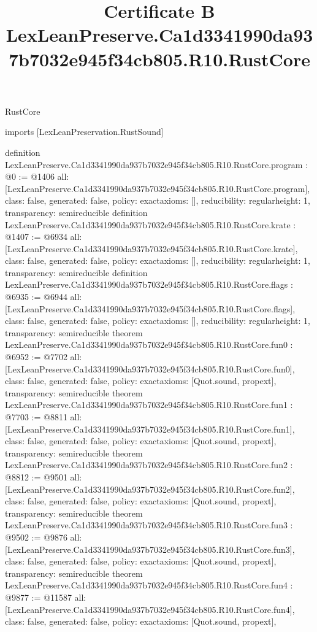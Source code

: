 \begin{lexlean}{RustCore}
\title{Certificate B LexLeanPreserve.Ca1d3341990da937b7032e945f34cb805.R10.RustCore}
\begin{coremodule}
imports [LexLeanPreservation.RustSound]

definition LexLeanPreserve.Ca1d3341990da937b7032e945f34cb805.R10.RustCore.program : @0 := @1406 {
  all: [LexLeanPreserve.Ca1d3341990da937b7032e945f34cb805.R10.RustCore.program],
  class: false,
  generated: false,
  policy: exact{axioms: []},
  reducibility: regular{height: 1},
  transparency: semireducible
}
definition LexLeanPreserve.Ca1d3341990da937b7032e945f34cb805.R10.RustCore.krate : @1407 := @6934 {
  all: [LexLeanPreserve.Ca1d3341990da937b7032e945f34cb805.R10.RustCore.krate],
  class: false,
  generated: false,
  policy: exact{axioms: []},
  reducibility: regular{height: 1},
  transparency: semireducible
}
definition LexLeanPreserve.Ca1d3341990da937b7032e945f34cb805.R10.RustCore.flags : @6935 := @6944 {
  all: [LexLeanPreserve.Ca1d3341990da937b7032e945f34cb805.R10.RustCore.flags],
  class: false,
  generated: false,
  policy: exact{axioms: []},
  reducibility: regular{height: 1},
  transparency: semireducible
}
theorem LexLeanPreserve.Ca1d3341990da937b7032e945f34cb805.R10.RustCore.fun0 : @6952 := @7702 {
  all: [LexLeanPreserve.Ca1d3341990da937b7032e945f34cb805.R10.RustCore.fun0],
  class: false,
  generated: false,
  policy: exact{axioms: [Quot.sound, propext]},
  transparency: semireducible
}
theorem LexLeanPreserve.Ca1d3341990da937b7032e945f34cb805.R10.RustCore.fun1 : @7703 := @8811 {
  all: [LexLeanPreserve.Ca1d3341990da937b7032e945f34cb805.R10.RustCore.fun1],
  class: false,
  generated: false,
  policy: exact{axioms: [Quot.sound, propext]},
  transparency: semireducible
}
theorem LexLeanPreserve.Ca1d3341990da937b7032e945f34cb805.R10.RustCore.fun2 : @8812 := @9501 {
  all: [LexLeanPreserve.Ca1d3341990da937b7032e945f34cb805.R10.RustCore.fun2],
  class: false,
  generated: false,
  policy: exact{axioms: [Quot.sound, propext]},
  transparency: semireducible
}
theorem LexLeanPreserve.Ca1d3341990da937b7032e945f34cb805.R10.RustCore.fun3 : @9502 := @9876 {
  all: [LexLeanPreserve.Ca1d3341990da937b7032e945f34cb805.R10.RustCore.fun3],
  class: false,
  generated: false,
  policy: exact{axioms: [Quot.sound, propext]},
  transparency: semireducible
}
theorem LexLeanPreserve.Ca1d3341990da937b7032e945f34cb805.R10.RustCore.fun4 : @9877 := @11587 {
  all: [LexLeanPreserve.Ca1d3341990da937b7032e945f34cb805.R10.RustCore.fun4],
  class: false,
  generated: false,
  policy: exact{axioms: [Quot.sound, propext]},
}
\end{coremodule}
\end{lexlean}
